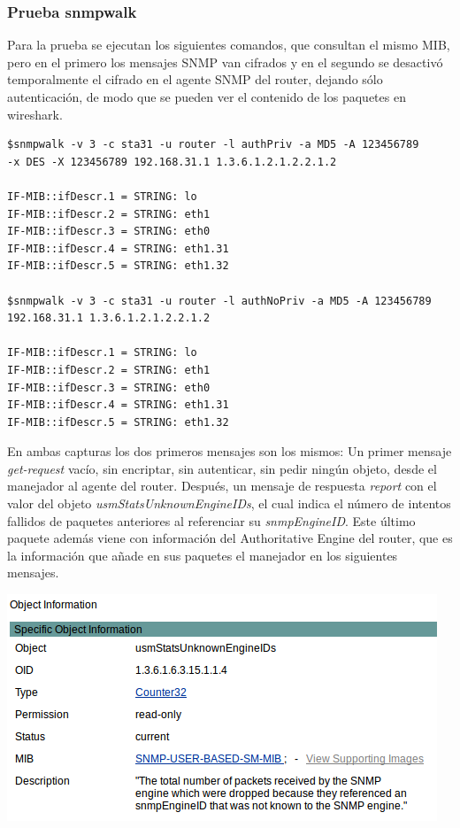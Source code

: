 \documentclass[]{article}
\begin{document}
\subsubsection{Prueba snmpwalk}

Para la prueba se ejecutan los siguientes comandos, que consultan el mismo MIB, pero en el primero los mensajes SNMP van cifrados y en el segundo se desactivó temporalmente el cifrado en el agente SNMP del router, dejando sólo autenticación, de modo que se pueden ver el contenido de los paquetes en wireshark.


\begin{Verbatim}[frame=single]
$snmpwalk -v 3 -c sta31 -u router -l authPriv -a MD5 -A 123456789
-x DES -X 123456789 192.168.31.1 1.3.6.1.2.1.2.2.1.2

IF-MIB::ifDescr.1 = STRING: lo
IF-MIB::ifDescr.2 = STRING: eth1
IF-MIB::ifDescr.3 = STRING: eth0
IF-MIB::ifDescr.4 = STRING: eth1.31
IF-MIB::ifDescr.5 = STRING: eth1.32

$snmpwalk -v 3 -c sta31 -u router -l authNoPriv -a MD5 -A 123456789 
192.168.31.1 1.3.6.1.2.1.2.2.1.2

IF-MIB::ifDescr.1 = STRING: lo
IF-MIB::ifDescr.2 = STRING: eth1
IF-MIB::ifDescr.3 = STRING: eth0
IF-MIB::ifDescr.4 = STRING: eth1.31
IF-MIB::ifDescr.5 = STRING: eth1.32
\end{Verbatim}

En ambas capturas los dos primeros mensajes son los mismos: Un primer mensaje \textit{get-request} vacío, sin encriptar, sin autenticar, sin pedir ningún objeto, desde el manejador al agente del router. Después, un mensaje de respuesta \textit{report} con el valor del objeto \textit{usmStatsUnknownEngineIDs}, el cual indica el número de intentos fallidos de paquetes anteriores al referenciar su \textit{snmpEngineID}. Este último paquete además viene con información del Authoritative Engine del router, que es la información que añade en sus paquetes el manejador en los siguientes mensajes.


\begin{center}
	\includegraphics[scale=0.75]{images/snmp/reportMIB.png}
\end{center}
\end{document}
